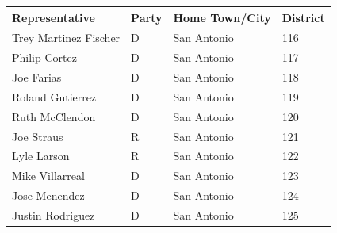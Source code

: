 \documentclass{article}
\begin{document}
\begin{tabular}{llll}
\toprule
Representative & Party & Home Town/City & District \\
\midrule
Trey Martinez Fischer & D & San Antonio & 116 \\
Philip Cortez & D & San Antonio & 117 \\
Joe Farias & D & San Antonio & 118 \\
Roland Gutierrez & D & San Antonio & 119 \\
Ruth McClendon & D & San Antonio & 120 \\
Joe Straus & R & San Antonio & 121 \\
Lyle Larson & R & San Antonio & 122 \\
Mike Villarreal & D & San Antonio & 123 \\
Jose Menendez & D & San Antonio & 124 \\
Justin Rodriguez & D & San Antonio & 125 \\
\bottomrule
\end{tabular}
\end{document}
